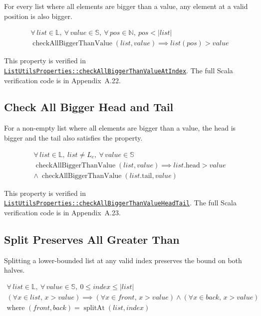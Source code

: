 For every list where all elements are bigger than a value, any element
at a valid position is also bigger.

\begin{gather*}
\forall\, list \in \mathbb{L},\ \forall\, value \in \mathbb{S},\ \forall\, pos \in \mathbb{N},\ pos < |list| \\
\operatorname{checkAllBiggerThanValue}(list, value) \implies list(pos) > value
\end{gather*}

{\raggedright
This property is verified in
\href{https://github.com/thiagomata/prime-numbers/blob/list-article-v1.0.0/src/main/scala/v1/chapter3/list/properties/ListUtilsProperties.scala}{\texttt{ListUtilsProperties::\allowbreak checkAllBiggerThanValueAtIndex}}.
The full Scala verification code is in Appendix~A.22.
\par}

\subsection{Check All Bigger Head and Tail}

For a non-empty list where all elements are bigger than a value, the
head is bigger and the tail also satisfies the property.

\begin{gather*}
\forall\, list \in \mathbb{L},\ list \neq L_e,\ \forall\, value \in \mathbb{S} \\
\operatorname{checkAllBiggerThanValue}(list, value) \implies list.\text{head} > value \\
\wedge\ \operatorname{checkAllBiggerThanValue}(list.\text{tail}, value)
\end{gather*}

{\raggedright
This property is verified in
\href{https://github.com/thiagomata/prime-numbers/blob/list-article-v1.0.0/src/main/scala/v1/chapter3/list/properties/ListUtilsProperties.scala}{\texttt{ListUtilsProperties::\allowbreak checkAllBiggerThanValueHeadTail}}.
The full Scala verification code is in Appendix~A.23.
\par}

\subsection{Split Preserves All Greater Than}

Splitting a lower-bounded list at any valid index preserves the bound on
both halves.

\begin{gather*}
\forall\, list \in \mathbb{L},\ \forall\, value \in \mathbb{S},\ 0 \leq index \leq |list| \\
(\forall x \in list,\, x > value) \implies (\forall x \in front,\, x > value) \wedge (\forall x \in back,\, x > value) \\
\text{where } (front, back) = \operatorname{splitAt}(list, index)
\end{gather*}

